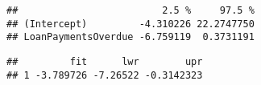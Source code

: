 \documentclass[]{article}
\newenvironment{Shaded}{\begin{snugshade}}{\end{snugshade}}
\newcommand{\KeywordTok}[1]{\textcolor[rgb]{0.13,0.29,0.53}{\textbf{#1}}}
\newcommand{\DataTypeTok}[1]{\textcolor[rgb]{0.13,0.29,0.53}{#1}}
\newcommand{\DecValTok}[1]{\textcolor[rgb]{0.00,0.00,0.81}{#1}}
\newcommand{\StringTok}[1]{\textcolor[rgb]{0.31,0.60,0.02}{#1}}
\newcommand{\CommentTok}[1]{\textcolor[rgb]{0.56,0.35,0.01}{\textit{#1}}}
\newcommand{\NormalTok}[1]{#1}
\begin{document}
\begin{verbatim}
##                         2.5 %     97.5 %
## (Intercept)         -4.310226 22.2747750
## LoanPaymentsOverdue -6.759119  0.3731191
\end{verbatim}

\begin{Shaded}
\end{Shaded}

\begin{verbatim}
##         fit      lwr        upr
## 1 -3.789726 -7.26522 -0.3142323
\end{verbatim}
\end{document}
